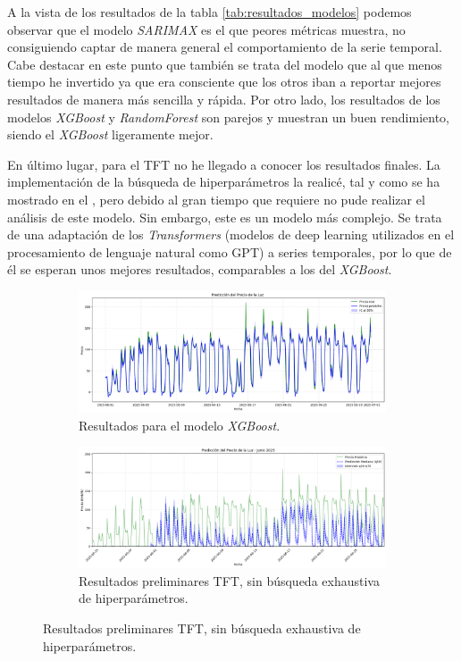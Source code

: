 A la vista de los resultados de la tabla \ref{tab:resultados_modelos} podemos observar que el modelo \textit{SARIMAX} es el que peores métricas muestra, no consiguiendo captar de manera general el comportamiento de la serie temporal. Cabe destacar en este punto que también se trata del modelo que al que menos tiempo he invertido ya que era consciente que los otros iban a reportar mejores resultados de manera más sencilla y rápida. Por otro lado, los resultados de los modelos \textit{XGBoost} y \textit{RandomForest} son parejos y muestran un buen rendimiento, siendo el \textit{XGBoost} ligeramente mejor.

En último lugar, para el TFT no he llegado a conocer los resultados finales. La implementación de la búsqueda de hiperparámetros la realicé, tal y como se ha mostrado en el , pero debido al gran tiempo que requiere no pude realizar el análisis de este modelo. Sin embargo, este es un modelo más complejo. Se trata de una adaptación de los \textit{Transformers} (modelos de deep learning utilizados en el procesamiento de lenguaje natural como GPT) a series temporales, por lo que de él se esperan unos mejores resultados, comparables a los del \textit{XGBoost}.

\begin{figure}[H]
\centering
\begin{subfigure}[b]{0.7\textwidth}
\centering
\includegraphics[width=\textwidth]{figuras/XGBoost_prediccion.png}
\caption[Resultados \textit{XGBoost}]{Resultados para el modelo \textit{XGBoost}.}
\label{ResultadosXGBoost}
\end{subfigure}
\begin{subfigure}[b]{0.7\textwidth}
\centering
\includegraphics[width=\textwidth]{figuras/TFT_predCon1.png}
\caption[Resultados preliminares TFT.]{Resultados preliminares TFT, sin búsqueda exhaustiva de hiperparámetros.}
\label{ResultadosTFT}
\end{subfigure}
\end{figure}



